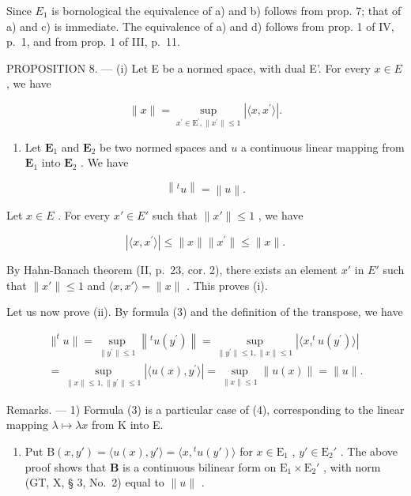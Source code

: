 Since \(E_{1}\) is bornological the equivalence of a) and b) follows from prop. 7; that of a) and c) is immediate. The equivalence of a) and d) follows from prop. 1 of IV, p.~1, and from prop. 1 of III, p.~11.

PROPOSITION 8. --- (i) Let E be a normed space, with dual E'. For every \(x \in E\) , we have

\[
\| x \| = \sup _ {x ^ {\prime} \in \mathrm{E} ^ {\prime}, \| x ^ {\prime} \| \leqslant 1} | \langle x, x ^ {\prime} \rangle |.\tag{3}
\]

\begin{enumerate}
\def\labelenumi{(\roman{enumi})}
\setcounter{enumi}{1}
\tightlist
\item
  Let \(\mathbf{E}_1\) and \(\mathbf{E}_2\) be two normed spaces and \(u\) a continuous linear mapping from \(\mathbf{E}_1\) into \(\mathbf{E}_2\) . We have
\end{enumerate}

\[
\left\| ^ {t} u \right\| = \left\| u \right\|.\tag{4}
\]

Let \(x \in E\) . For every \(x' \in E'\) such that \(\| x' \| \leqslant 1\) , we have

\[
\left| \langle x, x ^ {\prime} \rangle \right| \leqslant \| x \| \| x ^ {\prime} \| \leqslant \| x \|.
\]

By Hahn-Banach theorem (II, p.~23, cor. 2), there exists an element \(x'\) in \(E'\) such that \(\| x' \| \leqslant 1\) and \(\langle x, x' \rangle = \| x \|\) . This proves (i).

Let us now prove (ii). By formula (3) and the definition of the transpose, we have

\[
\begin{array}{l} \| ^ {t} u \| = \sup _ {\| y ^ {\prime} \| \leqslant 1} \left\| ^ {t} u (y ^ {\prime}) \right\| = \sup _ {\| y ^ {\prime} \| \leqslant 1, \| x \| \leqslant 1} \left| \langle x, ^ {t} u (y ^ {\prime}) \rangle \right| \\ = \sup _ {\| x \| \leqslant 1, \| y ^ {\prime} \| \leqslant 1} \left| \langle u (x), y ^ {\prime} \rangle \right| = \sup _ {\| x \| \leqslant 1} \left\| u (x) \right\| = \| u \|. \end{array}
\]

Remarks. --- 1) Formula (3) is a particular case of (4), corresponding to the linear mapping \(\lambda \mapsto \lambda x\) from K into E.

\begin{enumerate}
\def\labelenumi{\arabic{enumi})}
\setcounter{enumi}{1}
\tightlist
\item
  Put \(\mathrm{B}(x, y') = \langle u(x), y' \rangle = \langle x, {}^t u(y') \rangle\) for \(x \in \mathrm{E}_1\) , \(y' \in \mathrm{E}_2'\) . The above proof shows that \(\mathbf{B}\) is a continuous bilinear form on \(\mathrm{E}_1 \times \mathrm{E}_2'\) , with norm (GT, X, § 3, No.~2) equal to \(\| u \|\) .
\end{enumerate}

